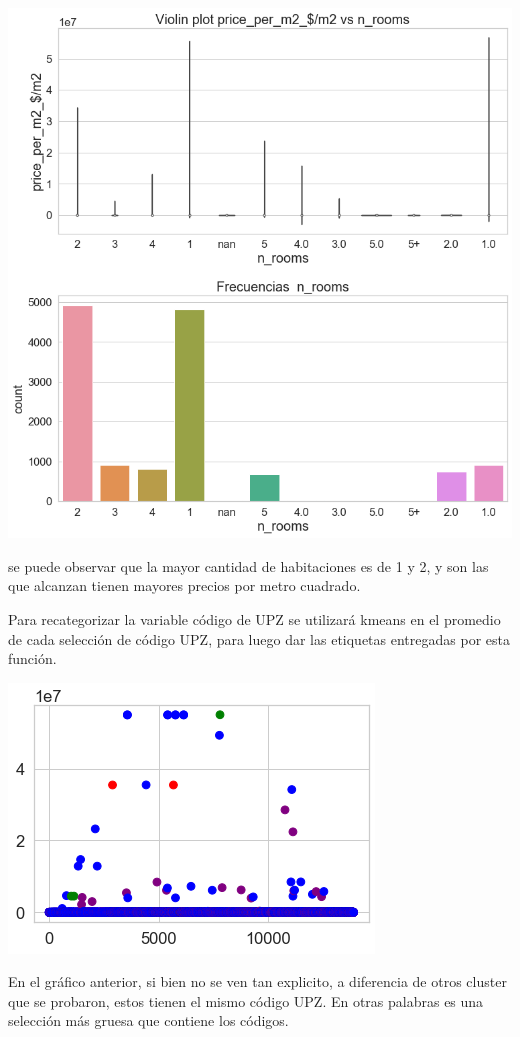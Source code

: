  \begin{center}
     \includegraphics[scale = 0.3]{img/ejemplos/P2-2-3.png}
 \end{center}
 se puede observar que la mayor cantidad de habitaciones es de 1 y 2, y son las que alcanzan tienen mayores precios por metro cuadrado.

Para recategorizar la variable código de UPZ se utilizará kmeans en el promedio de cada selección de código UPZ, para luego dar las etiquetas entregadas por esta función.

\begin{center}
    \includegraphics[scale = 0.5]{img/ejemplos/kluster.png}
\end{center}

En el gráfico anterior, si bien no se ven tan explicito, a diferencia de otros cluster que se probaron, estos tienen el mismo código UPZ. En otras palabras es una selección más gruesa que contiene los códigos.